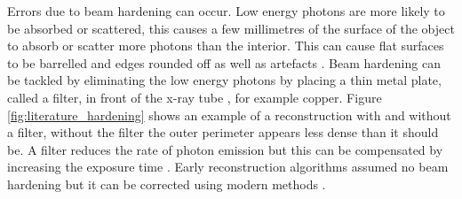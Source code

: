 Errors due to beam hardening can occur. Low energy photons are more likely to be absorbed or scattered, this causes a few millimetres of the surface of the object to absorb or scatter more photons than the interior. This can cause flat surfaces to be barrelled and edges rounded off \citep{kruth2011computed} as well as artefacts \citep{sun2016applications}. Beam hardening can be tackled by eliminating the low energy photons by placing a thin metal plate, called a filter, in front of the x-ray tube \citep{welkenhuyzen2009industrial}, for example copper. Figure \ref{fig:literature_hardening} shows an example of a reconstruction with and without a filter, without the filter the outer perimeter appears less dense than it should be.  A filter reduces the rate of photon emission but this can be compensated by increasing the exposure time \citep{kruth2011computed}. Early reconstruction algorithms assumed no beam hardening but it can be corrected using modern methods \citep{elbakri2001statistical, sun2016applications}.

